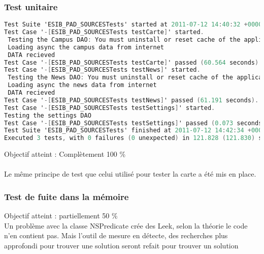 		 		 \subsubsection*{Test unitaire}
		 		 \begin{lstlisting}[language=C,caption = Log des test unitaires]
Test Suite 'ESIB_PAD_SOURCESTests' started at 2011-07-12 14:40:32 +0000
Test Case '-[ESIB_PAD_SOURCESTests testCarte]' started.
 Testing the Campus DAO: You must uninstall or reset cache of the application before testing
 Loading async the campus data from internet
 DATA recieved
Test Case '-[ESIB_PAD_SOURCESTests testCarte]' passed (60.564 seconds).
Test Case '-[ESIB_PAD_SOURCESTests testNews]' started.
 Testing the News DAO: You must uninstall or reset cache of the application before testing
 Loading async the news data from internet
 DATA recieved
Test Case '-[ESIB_PAD_SOURCESTests testNews]' passed (61.191 seconds).
Test Case '-[ESIB_PAD_SOURCESTests testSettings]' started.
Testing the settings DAO
Test Case '-[ESIB_PAD_SOURCESTests testSettings]' passed (0.073 seconds).
Test Suite 'ESIB_PAD_SOURCESTests' finished at 2011-07-12 14:42:34 +0000.
Executed 3 tests, with 0 failures (0 unexpected) in 121.828 (121.830) seconds
		 		 \end{lstlisting}
		 		Objectif atteint : {\color{green}Complètement 100 \% \CheckedBox}\\
		 		\\
		 		Le même principe de test que celui utilisé pour tester la carte a été mis en place.
		 		 \subsubsection*{Test de fuite dans la mémoire}
		 		 Objectif atteint : {\color{red}partiellement 50 \% \CheckedBox}\\
		 		 Un problème avec la classe NSPredicate crée des Leek, selon la théorie le code n'en contient pas. Mais l'outil de mesure en détecte, des recherches plus approfondi pour trouver une solution seront refait pour trouver un solution